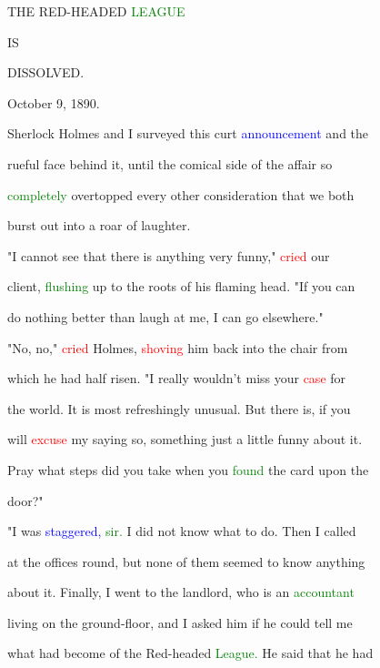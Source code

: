  THE RED-HEADED \textcolor{green}{LEAGUE}



 IS



 DISSOLVED.



 October 9, 1890.



 Sherlock Holmes and I surveyed this curt \textcolor{blue}{announcement} and the

 rueful face behind it, until the comical side of the affair so

 \textcolor{green}{completely} overtopped every other consideration that we both

 burst out into a roar of \textcolor{BurntOrange}{laughter.}



 "I cannot see that there is anything very funny," \textcolor{red}{cried} our

 client, \textcolor{green}{flushing} up to the roots of his flaming head. "If you can

 do nothing better than \textcolor{BurntOrange}{laugh} at me, I can go elsewhere."



 "No, no," \textcolor{red}{cried} Holmes, \textcolor{red}{shoving} him back into the chair from

 which he had half risen. "I really wouldn't miss your \textcolor{red}{case} for

 the world. It is most refreshingly unusual. But there is, if you

 will \textcolor{red}{excuse} my saying so, something just a little funny about it.

 \textcolor{BurntOrange}{Pray} what steps did you take when you \textcolor{green}{found} the card upon the

 door?"



 "I was \textcolor{blue}{staggered,} \textcolor{green}{sir.} I did not know what to do. Then I called

 at the offices round, but none of them seemed to know anything

 about it. \textcolor{BurntOrange}{Finally,} I went to the landlord, who is an \textcolor{green}{accountant}

 living on the ground-floor, and I asked him if he could tell me

 what had become of the Red-headed \textcolor{green}{League.} He said that he had

